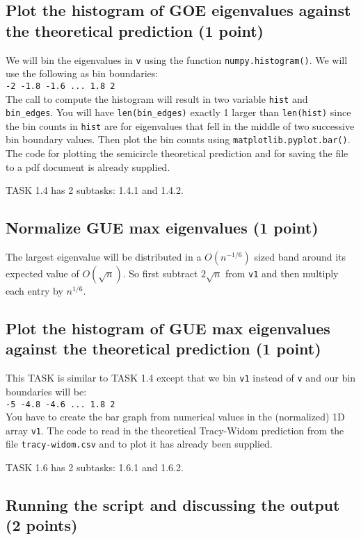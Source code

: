 \documentclass{article}
\begin{document}
\subsection{Plot the histogram of GOE eigenvalues against the theoretical
prediction (1 point)}

We will bin the eigenvalues in \verb#v# using the function \verb#numpy.histogram()#. We will use the following as bin boundaries:\\
\verb#-2 -1.8 -1.6 ... 1.8 2# \\
The call to compute the histogram will result in two variable \verb#hist# and \verb#bin_edges#. You will have \verb#len(bin_edges)#
exactly 1 larger than \verb#len(hist)# since the bin counts in \verb#hist# are for eigenvalues that fell in the middle of two successive
bin boundary values. Then plot the bin counts using \verb#matplotlib.pyplot.bar()#. The code for plotting the semicircle theoretical
prediction and for saving the file to a pdf document is already supplied.

TASK 1.4 has 2 subtasks: 1.4.1 and 1.4.2.

\subsection{Normalize GUE max eigenvalues (1 point)}

The largest eigenvalue will be distributed in a $O(n^{-1/6})$ sized band around its expected value of $O(\sqrt{n})$. So first subtract $2\sqrt{n}$ from
\verb#v1# and then multiply each entry by $n^{1/6}$.

\subsection{Plot the histogram of GUE max eigenvalues against the theoretical
prediction (1 point)}

This TASK is similar to TASK 1.4 except that we bin \verb#v1# instead of \verb#v# and our bin boundaries will be:\\
\verb#-5 -4.8 -4.6 ... 1.8 2# \\
You have to create the bar graph from numerical values in the (normalized) 1D array \verb#v1#. The code to read in the
theoretical Tracy-Widom prediction from the file \verb#tracy-widom.csv# and to plot it has already been supplied.

TASK 1.6 has 2 subtasks: 1.6.1 and 1.6.2.

\subsection{Running the script and discussing the output (2 points)}
\end{document}
